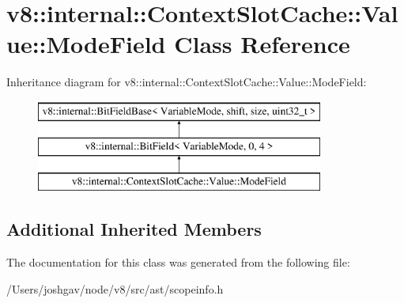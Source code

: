 \hypertarget{classv8_1_1internal_1_1_context_slot_cache_1_1_value_1_1_mode_field}{}\section{v8\+:\+:internal\+:\+:Context\+Slot\+Cache\+:\+:Value\+:\+:Mode\+Field Class Reference}
\label{classv8_1_1internal_1_1_context_slot_cache_1_1_value_1_1_mode_field}
Inheritance diagram for v8\+:\+:internal\+:\+:Context\+Slot\+Cache\+:\+:Value\+:\+:Mode\+Field\+:\begin{figure}[H]
\begin{center}
\leavevmode
\includegraphics[height=3.000000cm]{classv8_1_1internal_1_1_context_slot_cache_1_1_value_1_1_mode_field}
\end{center}
\end{figure}
\subsection*{Additional Inherited Members}


The documentation for this class was generated from the following file\+:\begin{DoxyCompactItemize}
\item 
/\+Users/joshgav/node/v8/src/ast/scopeinfo.\+h\end{DoxyCompactItemize}
